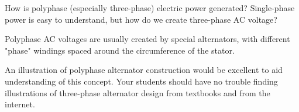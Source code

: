 

How is polyphase (especially three-phase) electric power generated?  Single-phase power is easy to understand, but how do we create three-phase AC voltage?







Polyphase AC voltages are usually created by special alternators, with different "phase" windings spaced around the circumference of the stator.







An illustration of polyphase alternator construction would be excellent to aid understanding of this concept.  Your students should have no trouble finding illustrations of three-phase alternator design from textbooks and from the internet.




